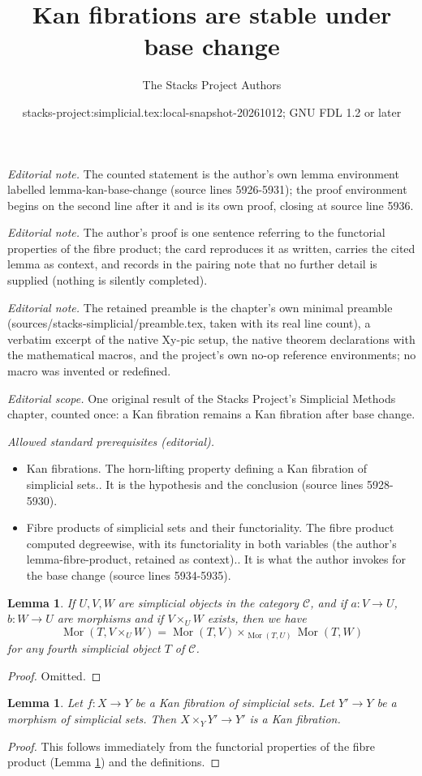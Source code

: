 \documentclass{stacks-project}
\title{Kan fibrations are stable under base change}
\author{The Stacks Project Authors}
\date{stacks-project:simplicial.tex:local-snapshot-20261012; GNU FDL 1.2 or later}
\theoremstyle{plain}
\newtheorem{lemma}[subsection]{Lemma}
\theoremstyle{definition}
\theoremstyle{remark}
\numberwithin{equation}{subsection}
\def\Mor{\mathop{\mathrm{Mor}}\nolimits}
\begin{document}
\maketitle
\noindent\textit{Editorial note.} The counted statement is the author's own lemma environment labelled lemma-kan-base-change (source lines 5926-5931); the proof environment begins on the second line after it and is its own proof, closing at source line 5936.\par\medskip
\noindent\textit{Editorial note.} The author's proof is one sentence referring to the functorial properties of the fibre product; the card reproduces it as written, carries the cited lemma as context, and records in the pairing note that no further detail is supplied (nothing is silently completed).\par\medskip
\noindent\textit{Editorial note.} The retained preamble is the chapter's own minimal preamble (sources/stacks-simplicial/preamble.tex, taken with its real line count), a verbatim excerpt of the native Xy-pic setup, the native theorem declarations with the mathematical macros, and the project's own no-op reference environments; no macro was invented or redefined.\par\medskip
\noindent\textit{Editorial scope.} One original result of the Stacks Project's Simplicial Methods chapter, counted once: a Kan fibration remains a Kan fibration after base change.\par\medskip
\noindent\textit{Allowed standard prerequisites (editorial).}\begin{itemize}
\item Kan fibrations. The horn-lifting property defining a Kan fibration of simplicial sets.. It is the hypothesis and the conclusion (source lines 5928-5930).
\item Fibre products of simplicial sets and their functoriality. The fibre product computed degreewise, with its functoriality in both variables (the author's lemma-fibre-product, retained as context).. It is what the author invokes for the base change (source lines 5934-5935).
\end{itemize}\medskip
\begin{lemma}
\label{lemma-fibre-product}
If $U, V, W$ are simplicial objects in the category $\mathcal{C}$,
and if $a : V \to U$, $b : W \to U$ are morphisms
and if $V \times_U W$ exists, then we have
$$
\Mor(T, V \times_U W) =
\Mor(T, V) \times_{\Mor(T, U)}
\Mor(T, W)
$$
for any fourth simplicial object $T$ of $\mathcal{C}$.
\end{lemma}

\begin{proof}
Omitted.
\end{proof}

\begin{lemma}
\label{lemma-kan-base-change}
Let $f : X \to Y$ be a Kan fibration of simplicial sets.
Let $Y' \to Y$ be a morphism of simplicial sets.
Then $X \times_Y Y' \to Y'$ is a Kan fibration.
\end{lemma}

\begin{proof}
This follows immediately from the functorial properties of the fibre
product (Lemma \ref{lemma-fibre-product}) and the definitions.
\end{proof}
\end{document}
